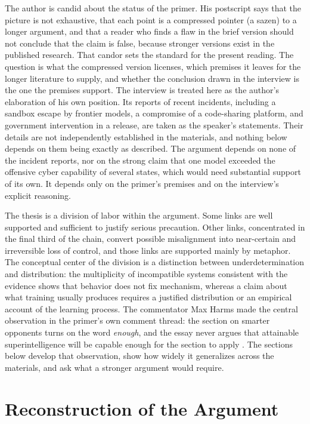 \documentclass[11pt]{article}
\begin{document}
The author is candid about the status of the primer. His postscript says that the picture is not exhaustive, that each point is a compressed pointer (a sazen) to a longer argument, and that a reader who finds a flaw in the brief version should not conclude that the claim is false, because stronger versions exist in the published research. That candor sets the standard for the present reading. The question is what the compressed version licenses, which premises it leaves for the longer literature to supply, and whether the conclusion drawn in the interview is the one the premises support. The interview is treated here as the author's elaboration of his own position. Its reports of recent incidents, including a sandbox escape by frontier models, a compromise of a code-sharing platform, and government intervention in a release, are taken as the speaker's statements. Their details are not independently established in the materials, and nothing below depends on them being exactly as described. The argument depends on none of the incident reports, nor on the strong claim that one model exceeded the offensive cyber capability of several states, which would need substantial support of its own. It depends only on the primer's premises and on the interview's explicit reasoning.

The thesis is a division of labor within the argument. Some links are well supported and sufficient to justify serious precaution. Other links, concentrated in the final third of the chain, convert possible misalignment into near-certain and irreversible loss of control, and those links are supported mainly by metaphor. The conceptual center of the division is a distinction between underdetermination and distribution: the multiplicity of incompatible systems consistent with the evidence shows that behavior does not fix mechanism, whereas a claim about what training usually produces requires a justified distribution or an empirical account of the learning process. The commentator Max Harms made the central observation in the primer's own comment thread: the section on smarter opponents turns on the word \textit{enough}, and the essay never argues that attainable superintelligence will be capable enough for the section to apply \citep{harms2024}. The sections below develop that observation, show how widely it generalizes across the materials, and ask what a stronger argument would require.

\section{Reconstruction of the Argument}
\end{document}
